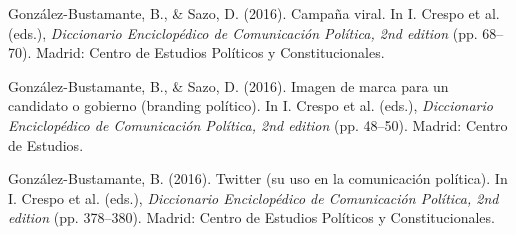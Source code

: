 \begin{publications}
\begin{benumerate}{12}

\item{\small González-Bustamante, B., \& Sazo, D. (2016). Campaña viral. In I. Crespo et al. (eds.), {\itshape Diccionario Enciclopédico de Comunicación Política, 2nd edition} (pp. 68--70). Madrid: Centro de Estudios Políticos y Constitucionales.}\vspace{1mm}


\item{\small González-Bustamante, B., \& Sazo, D. (2016). Imagen de marca para un candidato o gobierno (branding político). In I. Crespo et al. (eds.), {\itshape Diccionario Enciclopédico de Comunicación Política, 2nd edition} (pp. 48--50). Madrid: Centro de Estudios.}\vspace{1mm}


\item{\small González-Bustamante, B. (2016). Twitter (su uso en la comunicación política). In I. Crespo et al. (eds.), {\itshape Diccionario Enciclopédico de Comunicación Política, 2nd edition} (pp. 378--380). Madrid: Centro de Estudios Políticos y Constitucionales.}\vspace{1mm}



\end{benumerate}
\end{publications}
